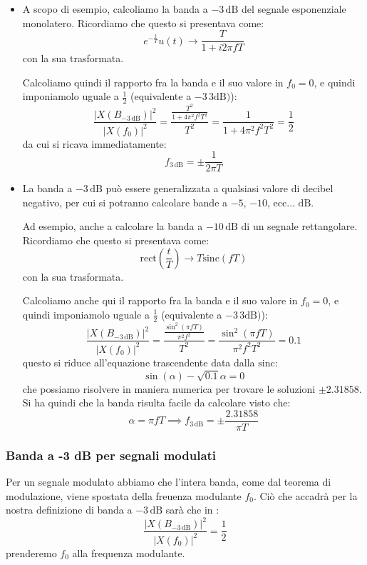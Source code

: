 \documentclass[a4paper,11pt]{article}
\begin{document}
\begin{itemize}
	\item A scopo di esempio, calcoliamo la banda a $-3 \, \mathrm{dB}$ del segnale esponenziale monolatero. Ricordiamo che questo si presentava come:
$$
e^{-\frac{t}{T}} u(t) \rightarrow \frac{T}{1 + i 2 \pi f T}
$$
con la sua trasformata.

Calcoliamo quindi il rapporto fra la banda e il suo valore in $f_0 = 0$, e quindi imponiamolo uguale a $\frac{1}{2}$ (equivalente a $-3 \, \mathrm{3 dB})$):
$$
\frac{| X(B_{-3 \, \mathrm{dB}}) |^2}{| X(f_0) |^2}
= \frac{ \frac{T^2}{1 + 4 \pi^2 f^2 T^2} }{ T^2 } = \frac{1}{ 1 + 4 \pi^2 f^2 T^2 } = \frac{1}{2}
$$
da cui si ricava immediatamente:
$$
f_{3\,\mathrm{dB}} = \pm \frac{1}{2 \pi T}
$$
\item La banda a $-3 \, \mathrm{dB}$ può essere generalizzata a qualsiasi valore di decibel negativo, per cui si potranno calcolare bande a $-5$, $-10$, ecc... $\mathrm{dB}$.

	Ad esempio, anche a calcolare la banda a $-10 \, \mathrm{dB}$ di un segnale rettangolare. Ricordiamo che questo si presentava come:
$$
\mathrm{rect} \left( \frac{t}{T} \right) \rightarrow T \mathrm{sinc} (fT) 
$$
con la sua trasformata.

Calcoliamo anche qui il rapporto fra la banda e il suo valore in $f_0 = 0$, e quindi imponiamolo uguale a $\frac{1}{2}$ (equivalente a $-3 \, \mathrm{3 dB})$):
$$
\frac{| X(B_{-3 \, \mathrm{dB}}) |^2}{| X(f_0) |^2}
= \frac{ \frac{\sin^2(\pi f T)}{\pi^2 f^2} }{ T^2 } = \frac{\sin^2(\pi f T)}{\pi^2 f^2 T^2} = 0.1
$$
questo si riduce all'equazione trascendente data dalla $\mathrm{sinc}$:
$$
\sin(\alpha) - \sqrt{0.1} \alpha = 0
$$
che possiamo risolvere in maniera numerica per trovare le soluzioni $\pm 2.31858$. Si ha quindi che la banda risulta facile da calcolare visto che:
$$
\alpha = \pi f T \implies f_{3\,\mathrm{dB}} = \pm \frac{2.31858}{\pi T}
$$

\end{itemize}

\subsubsection{Banda a -3 dB per segnali modulati}
Per un segnale modulato abbiamo che l'intera banda, come dal teorema di modulazione, viene spostata della freuenza modulante $f_0$.
Ciò che accadrà per la nostra definizione di banda a $-3 \, \mathrm{dB}$ sarà che in :
$$
\frac{| X(B_{-3 \, \mathrm{dB}}) |^2}{| X(f_0) |^2} = \frac{1}{2}
$$
prenderemo $f_0$ alla frequenza modulante.
\end{document}
